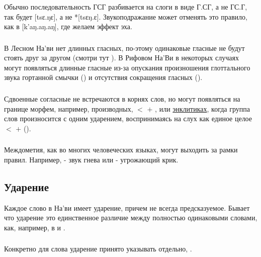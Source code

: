 \subsubsection{} Обычно последовательность ГСГ разбивается на слоги в виде Г.СГ, а не ГС.Г, так  будет [tsɛ.ŋɛ], а не *[tsɛŋ.ɛ].
Звукоподражание может отменять это правило, как в  [k'aŋ.aŋ.aŋ],
где желаем эффект эха.

\subsubsection{} В Лесном На'ви нет длинных гласных, по-этому одинаковые гласные не будут стоять друг за другом (смотри тут
).  В Рифовом На'Ви в некоторых случаях могут появляться длинные гласные из-за опускания произношения глоттального звука гортанной смычки () и отсутствия сокращения гласных
(). 

\subsubsection{} Сдвоенные согласные не встречаются в корнях слов, но могут появляться на границе морфем, например, производных,
 $<$  $+$ , или \href{https://ru.wikipedia.org/wiki/%D0%AD%D0%BD%D0%BA%D0%BB%D0%B8%D1%82%D0%B8%D0%BA%D0%B0}
{энклитиках}, 
когда группа слов произносится с одним ударением, воспринимаясь на слух как единое целое 
 $<$  $+$  ().

\subsubsection{} Междометия, как во многих человеческих языках, могут выходить за рамки правил. Например,  - звук гнева или 
 - угрожающий крик.


\subsection{Ударение}
Каждое слово в На'ви имеет ударение, причем не всегда предсказуемое.  Бывает что ударение это единственное различие между полностью одинаковыми словами, как, например, в  
и  .

\subsubsection{} Конкретно для слова  ударение принято указывать отдельно, .

